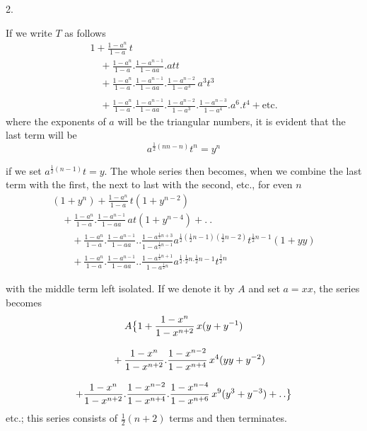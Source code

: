 \begingroup
\renewcommand{\arraystretch}{1.45}

\par\medskip{}\centerline{2.}\nobreak\smallskip
If we write $T$ as follows
\[
\begin{gathered}
1+\frac{1-a^n}{1-a}\,t
 \\[8pt]\quad{}+\frac{1-a^n}{1-a}.\frac{1-a^{n-1}}{1-aa}.att
 \\[8pt]\quad{}+\frac{1-a^n}{1-a}.\frac{1-a^{n-1}}{1-aa}.
  \frac{1-a^{n-2}}{1-a^3}\,a^3t^3
\\[8pt]
\qquad\\[8pt]\quad{}+\frac{1-a^n}{1-a}.\frac{1-a^{n-1}}{1-aa}.
  \frac{1-a^{n-2}}{1-a^3}.\frac{1-a^{n-3}}{1-a^4}.a^6.t^4
 +\text{etc.}
\end{gathered}
\]
where the exponents of $a$ will be the triangular numbers, it is evident
that the last term will be
\[
a^{\frac12(nn-n)}t^n=y^n
\]

if we set $a^{\frac12(n-1)}t=y$. The whole series then becomes,
when we combine the last term with the first, the next to last with the second,
etc., for even $n$
\[
\begin{gathered}
(1+y^n)+\frac{1-a^n}{1-a}\,t(1+y^{n-2})
 \\[8pt]\quad{}+\frac{1-a^n}{1-a}.\frac{1-a^{n-1}}{1-aa}\,at(1+y^{n-4})+.\ .
\\[8pt]
\qquad+\frac{1-a^n}{1-a}.\frac{1-a^{n-1}}{1-aa}..\frac{1-a^{\frac12n+3}}{1-a^{\frac12n-1}}
 a^{\frac12(\frac12n-1)(\frac12n-2)}t^{\frac12n-1}(1+yy)
\\[8pt]
\qquad+\frac{1-a^n}{1-a}.\frac{1-a^{n-1}}{1-aa}..\frac{1-a^{\frac12n+1}}{1-a^{\frac12n}}
 a^{\frac12.\frac12n.\frac12n-1}t^{\frac12n}
\end{gathered}
\]

with the middle term left isolated. If we denote it
by $A$ and set $a=xx$, the series becomes
\[
\begin{gathered}
A\bigl\{1+\frac{1-x^n}{1-x^{n+2}}\,x(y+y^{-1})
 \\[8pt]\quad{}+\frac{1-x^n}{1-x^{n+2}}.\frac{1-x^{n-2}}{1-x^{n+4}}\,x^4(yy+y^{-2})
\\[8pt]
+\frac{1-x^n}{1-x^{n+2}}.\frac{1-x^{n-2}}{1-x^{n+4}}.
 \frac{1-x^{n-4}}{1-x^{n+6}}\,x^9(y^3+y^{-3})+\mathinner{.\,.}\bigr\}
\end{gathered}
\]
etc.; this series consists of $\frac12(n+2)$ terms and then terminates.



